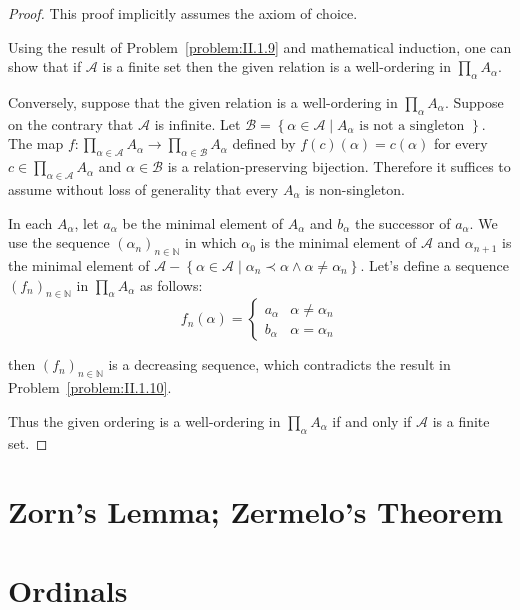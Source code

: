 \begin{proof}
	This proof implicitly assumes the axiom of choice.

	Using the result of Problem~\ref{problem:II.1.9} and mathematical induction, one can show that if \( \mathscr{A} \) is a finite set then the given relation is a well-ordering in \( \prod_{\alpha} A_{\alpha} \).

	Conversely, suppose that the given relation is a well-ordering in \( \prod_{\alpha} A_{\alpha} \). Suppose on the contrary that \( \mathscr{A} \) is infinite. Let \( \mathscr{B} = \left\{ \alpha \in \mathscr{A} \mid A_{\alpha} \text{ is not a singleton } \right\} \). The map \( f: \prod_{\alpha\in \mathscr{A}} A_{\alpha} \to \prod_{\alpha\in \mathscr{B}} A_{\alpha} \) defined by \( f(c)(\alpha) = c(\alpha) \) for every \( c \in \prod_{\alpha\in\mathscr{A}} A_{\alpha} \) and \( \alpha \in \mathscr{B} \) is a relation-preserving bijection. Therefore it suffices to assume without loss of generality that every \( A_{\alpha} \) is non-singleton.

	In each \( A_{\alpha} \), let \( a_{\alpha} \) be the minimal element of \( A_{\alpha} \) and \( b_{\alpha} \) the successor of \( a_{\alpha} \). We use the sequence \( {(\alpha_{n})}_{n\in\mathbb{N}} \) in which \( \alpha_{0} \) is the minimal element of \( \mathscr{A} \) and \( \alpha_{n+1} \) is the minimal element of \( \mathscr{A} - \left\{ \alpha \in \mathscr{A} \mid \alpha_{n} \prec \alpha \land \alpha \ne \alpha_{n} \right\} \). Let's define a sequence \( {(f_{n})}_{n\in\mathbb{N}} \) in \( \prod_{\alpha} A_{\alpha} \) as follows:
	\[
		f_{n}(\alpha) = \begin{cases}
			a_{\alpha} & \alpha \ne \alpha_{n} \\
			b_{\alpha} & \alpha = \alpha_{n}
		\end{cases}
	\]

	then \( {(f_{n})}_{n\in\mathbb{N}} \) is a decreasing sequence, which contradicts the result in Problem~\ref{problem:II.1.10}.

	Thus the given ordering is a well-ordering in \(\prod_{\alpha} A_{\alpha}\) if and only if \(\mathscr{A}\) is a finite set.
\end{proof}

\section{Zorn's Lemma; Zermelo's Theorem}

\section{Ordinals}


